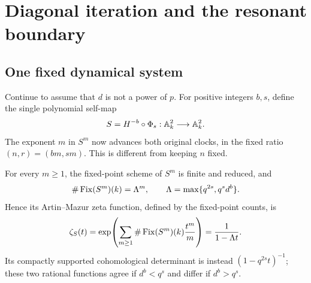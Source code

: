 \section{Diagonal iteration and the resonant boundary}\label{sec:diagonal}

\subsection{One fixed dynamical system}

Continue to assume that $d$ is not a power of $p$. For positive integers
$b,s$, define the single polynomial self-map
\begin{equation}\label{eq:diagonalmap}
 S=H^{-b}\circ\Phi_s:\mathbb A^2_k\longrightarrow\mathbb A^2_k.
\end{equation}
The exponent $m$ in $S^m$ now advances both original clocks, in the
fixed ratio $(n,r)=(bm,sm)$. This is different from keeping $n$ fixed.

\begin{proposition}
\label{prop:diagonal}
For every $m\geq1$, the fixed-point scheme of $S^m$ is finite and
reduced, and
\begin{equation}\label{eq:diagonalcount}
 \#\operatorname{Fix}(S^m)(k)=\Lambda^m,
 \qquad \Lambda=\max\{q^{2s},q^s d^b\}.
\end{equation}
Hence its Artin--Mazur zeta function, defined by the fixed-point counts,
is
\begin{equation}\label{eq:diagonalzeta}
 \zeta_S(t)=\exp\!\left(\sum_{m\geq1}\#\operatorname{Fix}(S^m)(k)\frac{t^m}{m}\right)
 =\frac{1}{1-\Lambda t}.
\end{equation}
Its compactly supported cohomological determinant is instead
$(1-q^{2s}t)^{-1}$; these two rational functions agree if $d^b<q^s$
and differ if $d^b>q^s$.
\end{proposition}

